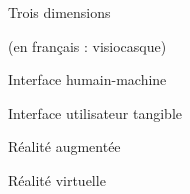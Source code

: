 \item [3D] Trois dimensions
\item [CAVE] 
\item [HMD]  (en français : visiocasque)
\item [GUI] 
\item [IHM] Interface humain-machine
\item [IUT] Interface utilisateur tangible
\item [RA] Réalité augmentée
\item [RV] Réalité virtuelle